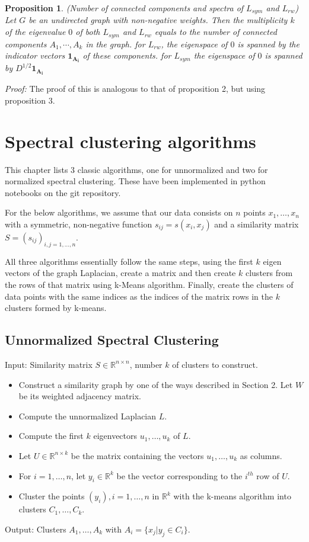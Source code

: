 \documentclass[10pt,a4paper, nocenter]{report}
\newtheorem{prop}{Proposition}
\begin{document}
			\begin{prop}
				(Number of connected components and spectra of $L_{sym}$ and $L_{rw}$) Let $G$ be an undirected graph with non-negative weights. Then the multiplicity $k$ of the eigenvalue $0$ of both $L_{sym}$ and $L_{rw}$ equals to the number of connected components $A_{1},\cdots,A_{k}$ in the graph. for $L_{rw}$, the eigenspace of $0$ is spanned by the indicator vectors $\mathbf{1_{A_{i}}}$ of these components. for $L_{sym}$ the eigenspace of $0$ is spanned by $D^{1/2}\mathbf{1_{A_{i}}}$
			\end{prop}
			\textit{Proof:} The proof of this is analogous to that of proposition 2, but using proposition 3.

	
	\chapter{Spectral clustering algorithms}
	This chapter lists 3 classic algorithms, one for unnormalized and two for normalized spectral clustering. These have been implemented in python notebooks on the git repository.
	
	For the below algorithms, we assume that our data consists on $n$ points $x_{1},\dots,x_{n}$ with a symmetric, non-negative function $s_{ij}=s(x_{i},x_{j})$ and a similarity matrix $S=(s_{ij})_{i,j=1,\dots,n}$. 
	
	All three algorithms essentially follow the same steps, using the first $k$ eigen vectors of the graph Laplacian, create a matrix and then create $k$ clusters from the rows of that matrix using k-Means algorithm. Finally, create the clusters of data points with the same indices as the indices of the matrix rows in the $k$ clusters formed by k-means.
	
	\section{Unnormalized Spectral Clustering}
	
	Input: Similarity matrix $S \in \mathbb{R}^{n\times n}$, number $k$ of clusters to construct.
	\begin{itemize}
		\item Construct a similarity graph by one of the ways described in Section 2. Let $W$ be its weighted adjacency matrix.
		\item Compute the unnormalized Laplacian $L$.
		\item Compute the first $k$ eigenvectors $u_{1},\dots, u_{k} $ of $L$.
		\item Let $U \in \mathbb{R}^{n\times k}$ be the matrix containing the vectors $u_{1},\dots, u_{k}$ as columns.
		\item For $i = 1,\dots, n$, let $y_{i} \in \mathbb{R}^k$ be the vector corresponding to the $i^{th}$ row of $U$.
		\item Cluster the points $(y_{i}), i=1,\dots,n$ in $\mathbb{R}^k$ with the k-means algorithm into clusters
		$C_{1},\dots, C_{k}$.
	\end{itemize}
	Output: Clusters $A_{1},\dots, A_{k}$ with $A_{i} = \{x_{j}| y_{j} \in C_{i}\}$.
	
\end{document}
